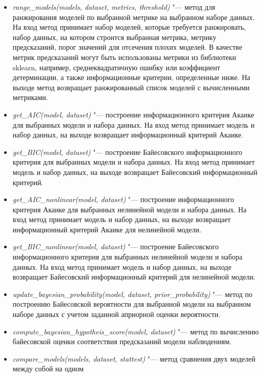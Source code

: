\begin{itemize}
   
\item \textit{range\_models(models, dataset, metrics, threshold)} "--- метод для ранжирования моделей по выбранной 
        метрике на выбранном наборе данных. На вход метод принимает набор моделей, которые требуется ранжировать, 
        набор данных, на котором строится выбранная метрика, метрику предсказаний, порог значений для отсечения 
        плохих моделей. В качестве метрик предсказаний могут быть использованы метрики из библиотеки sklearn, 
        например, среднеквадратичную ошибку или коэффициент детерминации, а также информационные критерии, 
        определенные ниже. На выходе метод возвращает ранжированный список моделей с вычисленными метриками.
\item \textit{get\_AIC(model, dataset)} "--- построение информационного критерия Акаике для выбранных модели и набора 
        данных. На вход метод принимает модель и набор данных, на выходе возвращает информационный критерий Акаике.
\item \textit{get\_BIC(model, dataset)} "--- построение Байесовского информационного критерия для выбранных модели и 
        набора данных. На вход метод принимает модель и набор данных, на выходе возвращает 
        Байесовский информационный критерий.
\item \textit{get\_AIC\_nonlinear(model, dataset)} "--- построение информационного критерия Акаике для выбранных 
        нелинейной модели и набора данных. На вход метод принимает модель и набор данных, на выходе возвращает 
        информационный критерий Акаике для нелинейной модели.
\item \textit{get\_BIC\_nonlinear(model, dataset)} "--- построение Байесовского информационного критерия для выбранных 
        нелинейной модели и набора данных. На вход метод принимает модель и набор данных, на выходе возвращает 
        Байесовский информационный критерий для нелинейной модели.
\item \textit{update\_bayesian\_probability(model, dataset, prior\_probability)} "--- метод по построению Байесовской 
        вероятности для выбранной модели на выбранном наборе данных с учетом заданной априорной оценки вероятности. 
\item \textit{compute\_bayesian\_hypotheis\_score(model, dataset)} "--- метод по вычислению байесовской оценки 
        соответствия предсказаний модели наблюдениям.
\item \textit{compare\_models(models, dataset, stattest)} "--- метод сравнения двух моделей между собой на одном 

\end{itemize}
